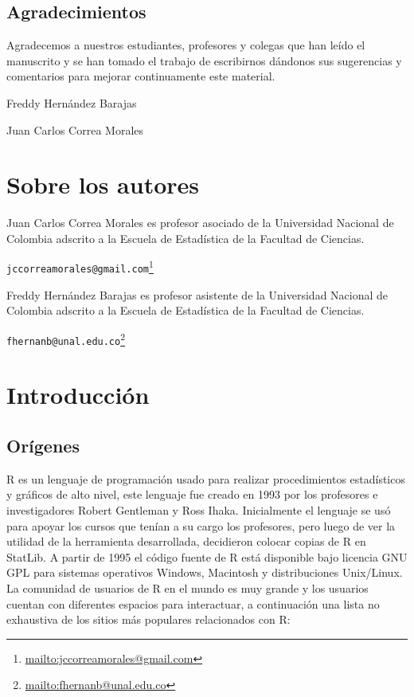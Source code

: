 \documentclass[10pt,]{krantz}
\let\proglang=\textsf
\renewcommand{\href}[2]{#2\footnote{\url{#1}}}
\let\BeginKnitrBlock\begin \let\EndKnitrBlock\end
\begin{document}
\section*{Agradecimientos}\label{agradecimientos}


Agradecemos a nuestros estudiantes, profesores y colegas que han leído
el manuscrito y se han tomado el trabajo de escribirnos dándonos sus
sugerencias y comentarios para mejorar continuamente este material.

\BeginKnitrBlock{flushright}
Freddy Hernández Barajas

Juan Carlos Correa Morales
\EndKnitrBlock{flushright}

\chapter*{Sobre los autores}\label{sobre-los-autores}


Juan Carlos Correa Morales es profesor asociado de la Universidad
Nacional de Colombia adscrito a la Escuela de Estadística de la Facultad
de Ciencias.

\href{mailto:jccorreamorales@gmail.com}{\nolinkurl{jccorreamorales@gmail.com}}

Freddy Hernández Barajas es profesor asistente de la Universidad
Nacional de Colombia adscrito a la Escuela de Estadística de la Facultad
de Ciencias.

\href{mailto:fhernanb@unal.edu.co}{\nolinkurl{fhernanb@unal.edu.co}}

\mainmatter

\chapter{\texorpdfstring{Introducción
\label{intro}}{Introducción }}\label{introduccion}

\section{Orígenes} \label{sec:origenes}

\proglang{R} es un lenguaje de programación usado para realizar
procedimientos estadísticos y gráficos de alto nivel, este lenguaje fue
creado en 1993 por los profesores e investigadores Robert Gentleman y
Ross Ihaka. Inicialmente el lenguaje se usó para apoyar los cursos que
tenían a su cargo los profesores, pero luego de ver la utilidad de la
herramienta desarrollada, decidieron colocar copias de \proglang{R} en
StatLib. A partir de 1995 el código fuente de \proglang{R} está
disponible bajo licencia GNU GPL para sistemas operativos Windows,
Macintosh y distribuciones Unix/Linux. La comunidad de usuarios de
\proglang{R} en el mundo es muy grande y los usuarios cuentan con
diferentes espacios para interactuar, a continuación una lista no
exhaustiva de los sitios más populares relacionados con \proglang{R}:
\end{document}
